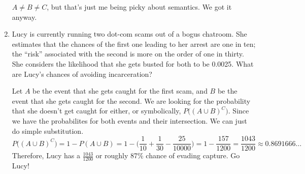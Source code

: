 \documentclass{article}
\begin{document}
\begin{enumerate}
\begin{solution}
{        \(A\neq{}B\neq{}C\), but that's just me being picky about semantics. We got it anyway. } 
    \end{solution}
    \item Lucy is currently running two dot-com scams out of a bogus chatroom. She estimates that the chances of the first one leading to her arrest are one in ten; the ``risk''
    associated with the second is more on the order of one in thirty. She considers the likelihood that she gets busted for both to be 0.0025. What are Lucy's chances of avoiding
    incarceration?\begin{solution}
        Let \(A\) be the event that she gets caught for the first scam, and \(B\) be the event that she gets caught for the second. We are looking for the probability that she doesn't get caught for either, 
        or symbolically, \(P\big({(A\cup{}B)}^C\big)\). Since we have the probabilites for both events and their intersection. We can just do simple substitution.\[
            P\big({(A\cup{}B)}^C\big) = 1 - P(A\cup{}B) = 1 - \biggl(\frac{1}{10} + \frac{1}{30} - \frac{25}{10000}\biggr) = 1 - \frac{157}{1200} = \frac{1043}{1200} \approx 0.8691666\ldots
        \] Therefore, Lucy has a \(\frac{1043}{1200}\) or roughly 87\% chance of evading capture. Go Lucy!
    \end{solution}
\end{enumerate}

\pagebreak
\end{document}
